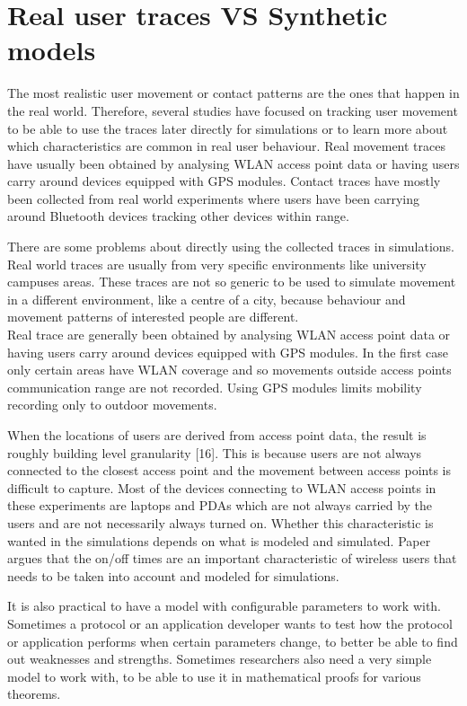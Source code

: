  


\section{Real user traces VS Synthetic models}
The most realistic user movement or contact patterns are the ones that happen in the real world. Therefore, several studies have focused on tracking user movement to be able to use the traces later directly for simulations or to learn more about which characteristics are common in real user behaviour.
Real movement traces have usually been obtained by analysing WLAN access point data or
having users carry around devices equipped with GPS modules. Contact traces have
mostly been collected from real world experiments where users have been carrying
around Bluetooth devices tracking other devices within range.

There are some problems about directly using the collected traces in simulations. Real world traces are usually from very specific environments like university campuses areas. These traces are not so generic to be used to simulate movement in a different environment, like a centre of a city, because behaviour and movement patterns of interested people are different. \\

Real trace are generally been obtained by analysing WLAN access point data or
having users carry around devices equipped with GPS modules. In the first case only certain areas have WLAN coverage and so movements outside access points communication range are not recorded. Using GPS modules limits mobility recording only to outdoor movements. 


When the locations of users are derived from access point data, the result is roughly building level granularity [16]. This is because users are not always connected to the closest access point and the movement between access points is difficult to capture. Most of the devices connecting to WLAN access points in these experiments are laptops and PDAs which are not always carried by the users and are not necessarily always turned on. Whether this characteristic is wanted in the simulations depends on what is modeled and simulated. Paper \cite{ImpactofHumanMobility} argues that the on/off times are an important characteristic of wireless users that needs to be taken into account and modeled for simulations. 

It is also practical to have a model with configurable parameters to work with. Sometimes a protocol or an application developer wants to test how the protocol or application performs when certain parameters change, to better be able to find out weaknesses and strengths. Sometimes researchers also need a very simple model to work with, to be able to use it in mathematical proofs for various theorems.


